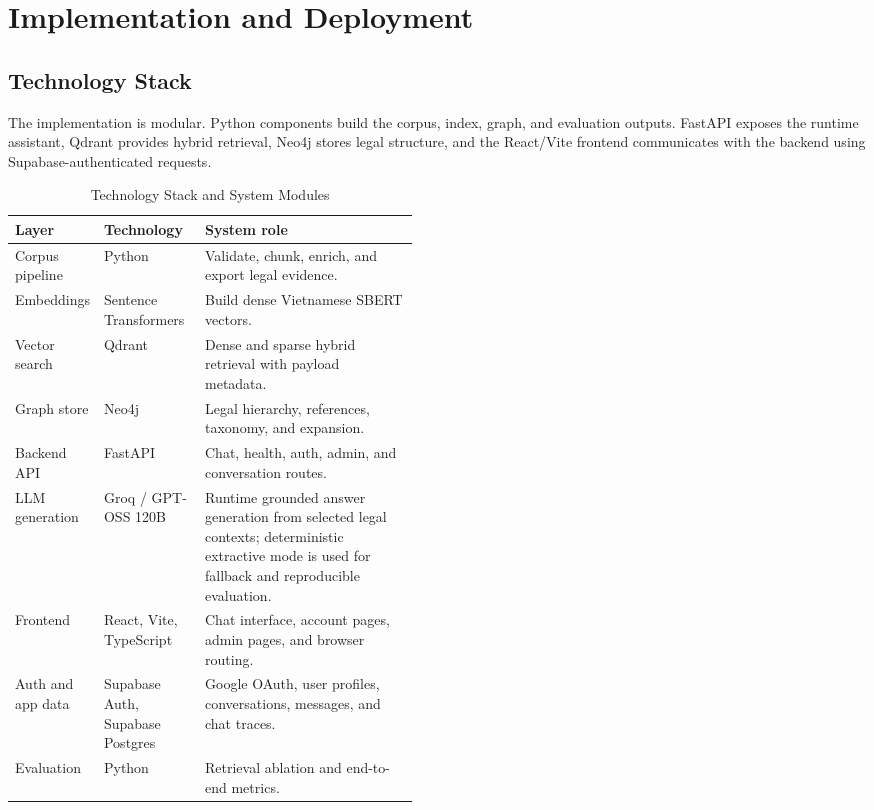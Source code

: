 \section{Implementation and Deployment}

\subsection{Technology Stack}
The implementation is modular. Python components build the corpus, index, graph, and evaluation outputs. FastAPI exposes the runtime assistant, Qdrant provides hybrid retrieval, Neo4j stores legal structure, and the React/Vite frontend communicates with the backend using Supabase-authenticated requests.

\begin{table}[H]
  \centering
  \caption{Technology Stack and System Modules}
  \label{tab:tech-stack-draft}
  \begin{tabularx}{\linewidth}{@{}L{0.22\linewidth}L{0.25\linewidth}Y@{}}
    \toprule
    Layer & Technology & System role \\
    \midrule
    Corpus pipeline & Python & Validate, chunk, enrich, and export legal evidence. \\
    Embeddings & Sentence Transformers & Build dense Vietnamese SBERT vectors. \\
    Vector search & Qdrant & Dense and sparse hybrid retrieval with payload metadata. \\
    Graph store & Neo4j & Legal hierarchy, references, taxonomy, and expansion. \\
    Backend API & FastAPI & Chat, health, auth, admin, and conversation routes. \\
    LLM generation & Groq / GPT-OSS 120B & Runtime grounded answer generation from selected legal contexts; deterministic extractive mode is used for fallback and reproducible evaluation. \\
    Frontend & React, Vite, TypeScript & Chat interface, account pages, admin pages, and browser routing. \\
    Auth and app data & Supabase Auth, Supabase Postgres & Google OAuth, user profiles, conversations, messages, and chat traces. \\
    Evaluation & Python & Retrieval ablation and end-to-end metrics. \\
    \bottomrule
  \end{tabularx}
\end{table}

